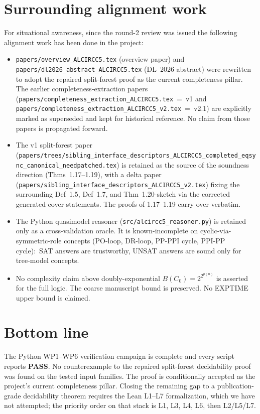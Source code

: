 \documentclass[11pt]{article}
\newcommand{\PASS}{\textcolor{black!70!green}{\textbf{PASS}}}
\begin{document}
\section{Surrounding alignment work}

For situational awareness, since the round-2 review was issued the
following alignment work has been done in the project:
\begin{itemize}[leftmargin=2em]
  \item \texttt{papers/overview\_ALCIRCC5.tex} (overview paper)
    and \texttt{papers/dl2026\_abstract\_ALCIRCC5.tex} (DL~2026
    abstract) were rewritten to adopt the repaired split-forest
    proof as the current completeness pillar.  The earlier
    completeness-extraction papers
    (\texttt{papers/completeness\_extraction\_ALCIRCC5.tex}~=~v1
    and
    \texttt{papers/completeness\_extraction\_ALCIRCC5\_v2.tex}~=~v2.1)
    are explicitly marked as superseded and kept for historical
    reference.  No claim from those papers is propagated forward.
  \item The v1 split-forest paper
    (\texttt{papers/trees/sibling\_interface\_descriptors\_ALCIRCC5\_completed\_eqsync\_canonical\_needpatched.tex})
    is retained as the source of the soundness direction
    (Thms~1.17--1.19), with a delta paper
    (\texttt{papers/sibling\_interface\_descriptors\_ALCIRCC5\_v2.tex})
    fixing the surrounding Def~1.5, Def~1.7, and Thm~1.20-sketch
    via the corrected generated-cover statements.  The proofs of
    1.17--1.19 carry over verbatim.
  \item The Python quasimodel reasoner
    (\texttt{src/alcircc5\_reasoner.py}) is retained only as a
    cross-validation oracle.  It is known-incomplete on
    cyclic-via-symmetric-role concepts (PO-loop, DR-loop, PP-PPI
    cycle, PPI-PP cycle):\ SAT answers are trustworthy, UNSAT
    answers are sound only for tree-model concepts.
  \item No complexity claim above doubly-exponential
    \(B(C_0) = 2^{2^{p(n)}}\) is asserted for the full logic.  The
    coarse manuscript bound is preserved.  No EXPTIME upper bound is
    claimed.
\end{itemize}

\section*{Bottom line}

The Python WP1--WP6 verification campaign is complete and every
script reports \PASS{}.  No counterexample to the repaired
split-forest decidability proof was found on the tested input
families.  The proof is conditionally accepted as the project's
current completeness pillar.  Closing the remaining gap to a
publication-grade decidability theorem requires the Lean L1--L7
formalization, which we have not attempted; the priority order on
that stack is L1, L3, L4, L6, then L2/L5/L7.
\end{document}
